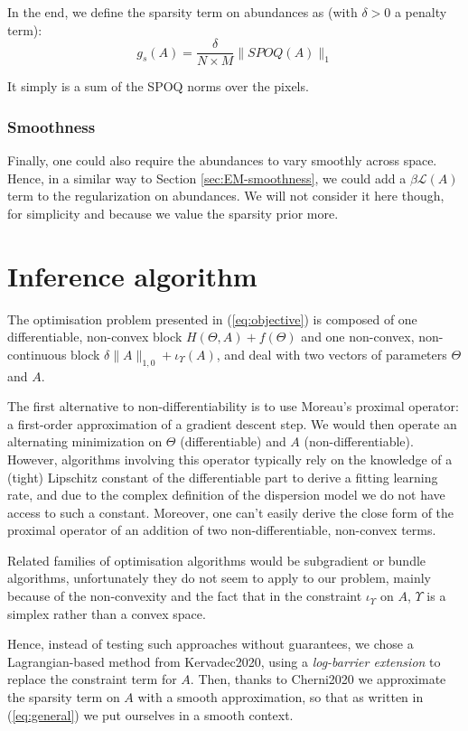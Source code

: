 \documentclass{article}
\begin{document}
In the end, we define the sparsity term on abundances as (with $\delta > 0$ a penalty term):
\begin{equation}\label{eq:g_s}
  g_s(A) = \frac{\delta}{N \times M} \| SPOQ(A) \|_{1}
\end{equation}

It simply is a sum of the SPOQ norms over the pixels.

\subsubsection{Smoothness}
Finally, one could also require the abundances to vary smoothly across space. Hence, in a similar way to Section \ref{sec:EM-smoothness}, we could add a $\beta \mathcal{L}(A)$ term to the regularization on abundances. We will not consider it here though, for simplicity and because we value the sparsity prior more.


\section{Inference algorithm}

The optimisation problem presented in (\ref{eq:objective}) is composed of one differentiable, non-convex block $H(\Theta, A) + f(\Theta)$ and one non-convex, non-continuous block $\delta\|A\|_{1,0} + \iota_\Upsilon (A)$, and deal with two vectors of parameters $\Theta$ and $A$.

The first alternative to non-differentiability is to use Moreau's proximal operator: a first-order approximation of a gradient descent step. We would then operate an alternating minimization on $\Theta$ (differentiable) and $A$ (non-differentiable). However, algorithms involving this operator typically rely on the knowledge of a (tight) Lipschitz constant of the differentiable part to derive a fitting learning rate, and due to the complex definition of the dispersion model we do not have access to such a constant. Moreover, one can't easily derive the close form of the proximal operator of an addition of two non-differentiable, non-convex terms.

Related families of optimisation algorithms would be subgradient or bundle algorithms, unfortunately they do not seem to apply to our problem, mainly because of the non-convexity and the fact that in the constraint $\iota_\Upsilon$ on $A$, $\Upsilon$ is a simplex rather than a convex space.

Hence, instead of testing such approaches without guarantees, we chose a Lagrangian-based method from Kervadec2020, using a \emph{log-barrier extension} to replace the constraint term for $A$. Then, thanks to Cherni2020 we approximate the sparsity term on $A$ with a smooth approximation, so that as written in (\ref{eq:general}) we put ourselves in a smooth context.
\end{document}

